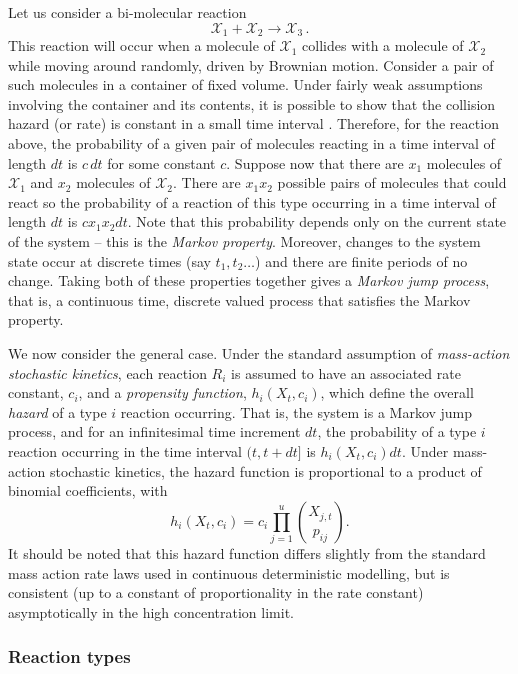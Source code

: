 \documentclass[12pt, DIV12]{scrartcl}
\begin{document}
Let us consider a bi-molecular reaction
\[
\mathcal{X}_{1}+\mathcal{X}_{2} \longrightarrow \mathcal{X}_{3}\,. 
\]
This reaction will occur when a molecule of $\mathcal{X}_{1}$ collides with a
molecule of $\mathcal{X}_{2}$ while moving around randomly, driven by Brownian
motion. Consider a pair of such molecules in a container of fixed volume. Under
fairly weak assumptions involving the container and its contents, it is possible
to show that the collision hazard (or rate) is constant in a small time interval
\citep{Gillespie92b}. Therefore, for the reaction above, the probability of a
given pair of molecules reacting in a time interval of length $dt$ is $c\,dt$
for some constant $c$. Suppose now that there are $x_{1}$ molecules of
$\mathcal{X}_{1}$ and $x_{2}$ molecules of $\mathcal{X}_{2}$. There are
$x_{1}x_{2}$ possible pairs of molecules that could react so the probability of
a reaction of this type occurring in a time interval of length $dt$ is
$cx_{1}x_{2}dt$. Note that this probability depends only on the current state of
the system -- this is the \emph{Markov property}. Moreover, changes to the
system state occur at discrete times (say $t_{1},t_{2}\ldots$) and there are
finite periods of no change. Taking both of these properties together gives a
\emph{Markov jump process}, that is, a continuous time, discrete valued process
that satisfies the Markov property.


We now consider the general case. Under the standard assumption of
\emph{mass-action stochastic kinetics}, each reaction $R_i$ is assumed to have
an associated rate constant, $c_i$, and a \emph{propensity function},
$h_i(X_t,c_i)$, which define the overall \emph{hazard} of a type $i$ reaction
occurring. That is, the system is a Markov jump process, and for an
infinitesimal time increment $dt$, the probability of a type $i$ reaction
occurring in the time interval $(t,t+dt]$ is $h_i(X_t,c_i)dt$. Under mass-action
stochastic kinetics, the hazard function is proportional to a product of
binomial coefficients, with
\[
h_i(X_t,c_i) = c_i\prod_{j=1}^u \binom{X_{j,t}}{p_{ij}}.
\]
It should be noted that this hazard function differs slightly from the standard
mass action rate laws used in continuous deterministic modelling, but is
consistent (up to a constant of proportionality in the rate constant)
asymptotically in the high concentration limit.

\subsubsection{Reaction types}
\end{document}
